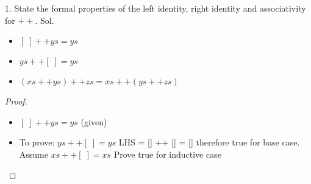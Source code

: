 
1. State the formal properties of the left identity, right identity
and associativity for \( ++ \). \newline
Sol. 

\begin{itemize}
  \item \( [\;]++ys = ys \) 
  \item \( ys++[\;] = ys \) 
  \item \( (xs++ys)++zs =xs++(ys++zs)\) 
\end{itemize}

\begin{proof}

  \begin{itemize}
    \item \( [\;] ++ ys = ys \) (given)
    \item  To prove: \( ys ++ [\;] = ys \) \newline
      LHS = [\;] ++ [\;] = [\;] therefore true for base case. \newline
      Assume \( xs ++ [\;] = xs\)
      Prove true for inductive case
  \end{itemize}
  
\end{proof}
